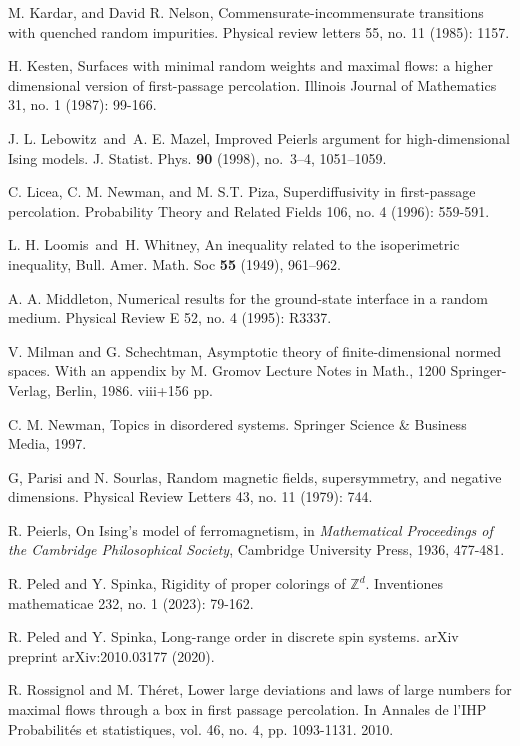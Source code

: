 \documentclass[11pt, reqno]{amsart}
\numberwithin{equation}{section}
\begin{document}
\begin{thebibliography}{}
M. Kardar, and David R. Nelson, Commensurate-incommensurate transitions with quenched random impurities. Physical review letters 55, no. 11 (1985): 1157.

H. Kesten, Surfaces with minimal random weights and maximal flows: a higher dimensional version of first-passage percolation. Illinois Journal of Mathematics 31, no. 1 (1987): 99-166.

J. L. Lebowitz\ and\ A. E. Mazel, Improved Peierls argument for high-dimensional Ising models.
J. Statist. Phys. {\bf 90} (1998), no.~3--4, 1051--1059.

C. Licea, C. M. Newman, and M. S.T. Piza, Superdiffusivity in first-passage percolation. Probability Theory and Related Fields 106, no. 4 (1996): 559-591.

L. H. Loomis\ and\ H. Whitney, An inequality related to the isoperimetric inequality, Bull. Amer. Math. Soc {\bf 55} (1949), 961--962.

A. A. Middleton, Numerical results for the ground-state interface in a random medium. Physical Review E 52, no. 4 (1995): R3337.

V. Milman and G. Schechtman,
Asymptotic theory of finite-dimensional normed spaces.
With an appendix by M. Gromov
Lecture Notes in Math., 1200
Springer-Verlag, Berlin, 1986. viii+156 pp.

C. M. Newman, Topics in disordered systems. Springer Science \& Business Media, 1997.

G, Parisi and N. Sourlas, Random magnetic fields, supersymmetry, and negative dimensions. Physical Review Letters 43, no. 11 (1979): 744.

R. Peierls, On Ising's model of ferromagnetism, in {\it Mathematical Proceedings of the Cambridge Philosophical Society}, Cambridge University Press, 1936, 477-481. 

R. Peled and Y. Spinka, Rigidity of proper colorings of $\mathbb{Z}^d$. Inventiones mathematicae 232, no. 1 (2023): 79-162.

R. Peled and Y. Spinka, Long-range order in discrete spin systems. arXiv preprint arXiv:2010.03177 (2020).

R. Rossignol and M. Th\'eret, Lower large deviations and laws of large numbers for maximal flows through a box in first passage percolation. In Annales de l'IHP Probabilités et statistiques, vol. 46, no. 4, pp. 1093-1131. 2010.


\end{thebibliography}
\end{document}
